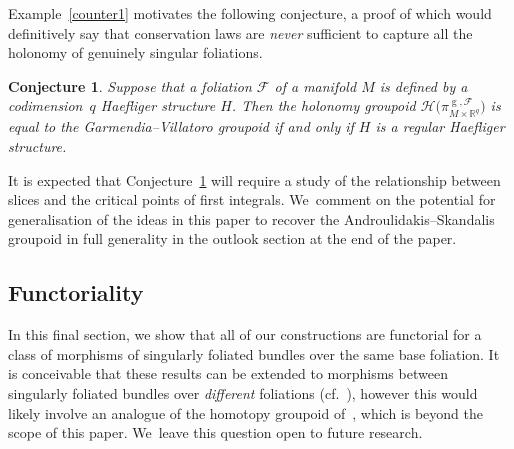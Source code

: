 \documentclass[10pt,a4paper]{amsart}
\numberwithin{equation}{section}
\newtheorem{Conjecture}[Theorem]{Conjecture}
\def\g{\operatorname{g}}
\def\FF{{\mathcal{F}}}
\def\HH{{\mathcal{H}}}
\def\RB{{\mathbb{R}}}
\begin{document}
Example~\ref{counter1} motivates the following conjecture, a proof of which would definitively say that conservation laws are \textit{never} sufficient to capture all the holonomy of genuinely singular foliations.

\begin{Conjecture}\label{Conjecture}
Suppose that a foliation $\FF$ of a manifold $M$ is defined by a codimension~$q$ Haefliger structure $H$. Then the holonomy groupoid $\HH\big(\pi_{M\times\RB^{q}}^{\g,\FF}\big)$ is equal to the Garmendia--Villatoro groupoid if and only if $H$ is a regular Haefliger structure.
\end{Conjecture}

It is expected that Conjecture~\ref{Conjecture} will require a study of the relationship between slices and the critical points of first integrals. We~comment on the potential for generalisation of the ideas in this paper to recover the Androulidakis--Skandalis groupoid in full generality in the outlook section at the end of the paper.

\subsection{Functoriality}

In this final section, we show that all of our constructions are functorial for a class of morphisms of singularly foliated bundles over the same base foliation. It is conceivable that these results can be extended to morphisms between singularly foliated bundles over \textit{different} foliations (cf.~\cite[Theorem~6.21]{VilGar1}), however this would likely involve an analogue of the homotopy groupoid of~\cite{VilGar1}, which is beyond the scope of this paper. We~leave this question open to future research.
\end{document}
